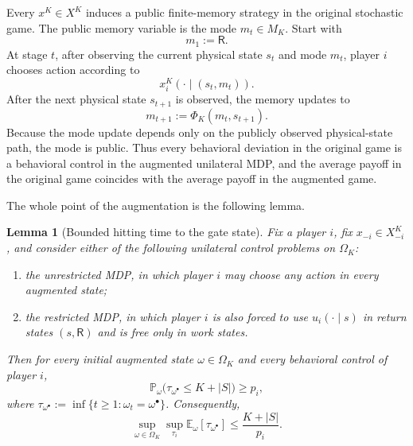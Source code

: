 \documentclass[11pt]{article}
\newtheorem{lemma}[theorem]{Lemma}
\theoremstyle{definition}
\newcommand{\E}{\mathbb{E}}
\newcommand{\Prob}{\mathbb{P}}
\newcommand{\1}{\mathbf{1}}
\begin{document}
Every $x^K\in X^K$ induces a public finite-memory strategy in the original stochastic game. The public memory variable is the mode $m_t\in M_K$. Start with
\[
m_1:=\mathsf R.
\]
At stage $t$, after observing the current physical state $s_t$ and mode $m_t$, player $i$ chooses action according to
\[
x_i^K(\cdot\mid (s_t,m_t)).
\]
After the next physical state $s_{t+1}$ is observed, the memory updates to
\[
m_{t+1}:=\Phi_K(m_t,s_{t+1}).
\]
Because the mode update depends only on the publicly observed physical-state path, the mode is public. Thus every behavioral deviation in the original game is a behavioral control in the augmented unilateral MDP, and the average payoff in the original game coincides with the average payoff in the augmented game.

The whole point of the augmentation is the following lemma.

\begin{lemma}[Bounded hitting time to the gate state]\label{lem:gate-hit}
Fix a player $i$, fix $x_{-i}\in X_{-i}^K$, and consider either of the following unilateral control problems on $\Omega_K$:
\begin{enumerate}[label=\textup{(\roman*)},leftmargin=2.5em]
\item the \emph{unrestricted} MDP, in which player $i$ may choose any action in every augmented state;
\item the \emph{restricted} MDP, in which player $i$ is also forced to use $u_i(\cdot\mid s)$ in return states $(s,\mathsf R)$ and is free only in work states.
\end{enumerate}
Then for every initial augmented state $\omega\in\Omega_K$ and every behavioral control of player $i$,
\begin{equation}\label{eq:gate-prob}
\Prob_{\omega}\!\bigl(\tau_{\omega^\bullet}\le K+|S|\bigr)\ge p_i,
\end{equation}
where $\tau_{\omega^\bullet}:=\inf\{t\ge1:\omega_t=\omega^\bullet\}$.
Consequently,
\begin{equation}\label{eq:gate-mean}
\sup_{\omega\in\Omega_K}\sup_{\tau_i}\E_{\omega}[\tau_{\omega^\bullet}]
\le \frac{K+|S|}{p_i}.
\end{equation}
\end{lemma}
\end{document}
